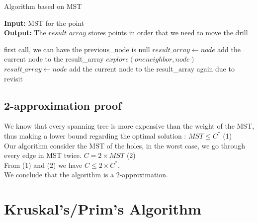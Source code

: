 \documentclass{article}
\begin{document}
\begin{algorithm}[H]
\caption{Algorithm based on MST}
\textbf{Input: }MST for the point\\
\textbf{Output: }The $result\_array$ stores points in order that we need to move the drill
\begin{algorithmic} 
 \Comment first call, we can have the previous\_node is null
\State $result\_array \leftarrow node$  \Comment add the current node to the result\_array
    \State $explore(one neighbor, node)$
\EndWhile
\State $result\_array \leftarrow node$ \Comment add the current node to the result\_array again due to revisit
\EndProcedure
\end{algorithmic}
\end{algorithm}
\subsection{2-approximation proof}
We know that every spanning tree is more expensive than the weight of the MST, thus making a lower bound regarding the optimal solution :
$MST \leq C^{*}$  (1)\\
Our algorithm consider the MST of the holes, in the worst case, we go through every edge in MST twice.
$C = 2 \times MST$  (2)\\ 
From (1) and (2) we have $C \leq 2 \times C^{*}$.\\
We conclude that the algorithm is a 2-approximation.

\section{Kruskal's/Prim's Algorithm}
\end{document}
